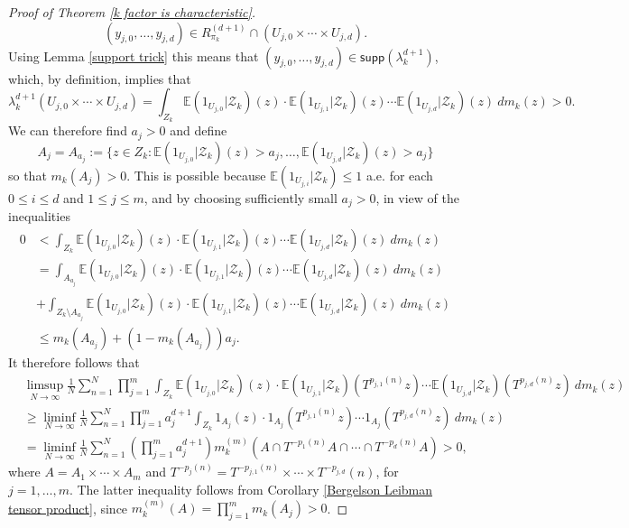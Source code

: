 \documentclass[reqno]{amsart}
\newcommand{\supp}{\mathsf{supp}}
\theoremstyle{definition}
\theoremstyle{remark}
\begin{document}
\begin{proof}[Proof of Theorem \ref{k factor is characteristic}]
$$(y_{j,0},\ldots,y_{j,d}) \in R^{(d+1)}_{\pi_{k}} \cap (U_{j,0}\times \cdots \times U_{j,d}).$$
Using Lemma \ref{support trick} this means that $(y_{j,0},\ldots,y_{j,d}) \in \supp(\lambda^{d+1}_{k})$, which, by definition, implies that 
$$\lambda^{d+1}_{k}(U_{j,0}\times \cdots \times U_{j,d})= \int_{Z_{k}} \mathbb{E}(\mathrm{1}_{U_{j,0}} | \mathcal{Z}_{k})(z) \cdot \mathbb{E}(\mathrm{1}_{U_{j,1}} | \mathcal{Z}_{k})(z)\cdots \mathbb{E}(\mathrm{1}_{U_{j,d}} | \mathcal{Z}_{k})(z)\ dm_{k}(z)>0.$$
We can therefore find $a_j>0$ and define 
$$A_j=A_{a_j}:=\{z\in Z_{k}: \mathbb{E}(\mathrm{1}_{U_{j,0}} | \mathcal{Z}_{k})(z) > a_j, \ldots, \mathbb{E}(\mathrm{1}_{U_{j,d}} | \mathcal{Z}_{k})(z)>a_j \}$$
so that $m_{k}(A_j)>0$. This is possible because 
$\mathbb{E}(\mathrm{1}_{U_{j,i}} | \mathcal{Z}_{k})\leq 1$ 
a.e. for each $0\leq i \leq d$ and $1\leq j\leq m$, and by choosing sufficiently small $a_j>0$, in view of the inequalities
\begin{align*}
    0 &<  \int_{Z_{k}} \mathbb{E}(\mathrm{1}_{U_{j,0}} | \mathcal{Z}_{k})(z) \cdot \mathbb{E}(\mathrm{1}_{U_{j,1}} | \mathcal{Z}_{k})(z)\cdots \mathbb{E}(\mathrm{1}_{U_{j,d}} | \mathcal{Z}_{k})(z)\ dm_{k}(z) \\ 
& = \int_{A_{a_j}} \mathbb{E}(\mathrm{1}_{U_{j,0}} | \mathcal{Z}_{k})(z) \cdot \mathbb{E}(\mathrm{1}_{U_{j,1}} | \mathcal{Z}_{k})(z)\cdots \mathbb{E}(\mathrm{1}_{U_{j,d}} | \mathcal{Z}_{k})(z)\ dm_{k}(z) \\
& + \int_{Z_{k}\setminus A_{a_j}} \mathbb{E}(\mathrm{1}_{U_{j,0}} | \mathcal{Z}_{k})(z) \cdot \mathbb{E}(\mathrm{1}_{U_{j,1}} | \mathcal{Z}_{k})(z)\cdots \mathbb{E}(\mathrm{1}_{U_{j,d}} | \mathcal{Z}_{k})(z)\ dm_{k}(z) \\ & \leq m_k(A_{a_j})+(1-m_k(A_{a_j}))a_j.
\end{align*} 
It therefore follows that
\begin{align*}
& \limsup_{N\to \infty} \frac{1}{N}\sum_{n=1}^N \prod_{j=1}^m \int_{Z_{k}} \mathbb{E}(\mathrm{1}_{U_{j,0}} | \mathcal{Z}_{k})(z) \cdot \mathbb{E}(\mathrm{1}_{U_{j,1}} | \mathcal{Z}_{k})(T^{p_{j,1}(n)}z)\cdots \mathbb{E}(\mathrm{1}_{U_{j,d}} | \mathcal{Z}_{k})(T^{p_{j,d}(n)}z)\ dm_{k}(z) \\ & \geq  
\liminf_{N\to \infty} \frac{1}{N}\sum_{n=1}^N \prod_{j=1}^m a_j^{d+1}  \int_{Z_{k}} \mathrm{1}_{A_j}(z) \cdot \mathrm{1}_{A_j}(T^{p_{j,1}(n)}z)\cdots \mathrm{1}_{A_j}(T^{p_{j,d}(n)}z)\ dm_{k}(z) \\ & =
\liminf_{N\to \infty} \frac{1}{N}\sum_{n=1}^N \left( \prod_{j=1}^m a_j^{d+1} \right) m_{k}^{(m)} \left(A \cap T^{-p_1(n)}A \cap \cdots \cap T^{-p_d(n)} A \right)>0,
\end{align*}
where $A=A_1 \times \cdots \times A_m$ and $T^{-p_j(n)}=T^{-p_{j,1}(n)} \times \cdots \times T^{-p_{j,d}}(n)$, for $j=1,\ldots,m$. The latter inequality follows from Corollary \ref{Bergelson Leibman tensor product}, since $m_k^{(m)}(A)=\prod_{j=1}^m m_k(A_j)>0$.
\end{proof}
\end{document}
